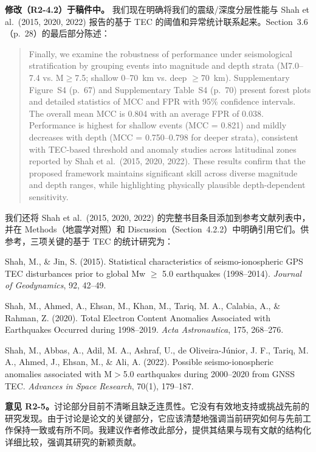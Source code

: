 \documentclass[12pt]{article}
\newcommand{\revcomment}[1]{\begingroup\color{commentcolor}#1\endgroup}
\newcommand{\revchange}[1]{\begingroup\color{changecolor}#1\endgroup}
\begin{document}
\revchange{%
\textbf{修改（R2-4.2）于稿件中。}
我们现在明确将我们的震级/深度分层性能与 Shah et al.~(2015, 2020, 2022) 报告的基于 TEC 的阈值和异常统计联系起来。Section~3.6（p.~28）的最后部分陈述：

\begin{quote}
Finally, we examine the robustness of performance under seismological stratification by grouping events into magnitude and depth strata (M7.0--7.4 vs. M$\ge$7.5; shallow 0--70~km vs. deep $\ge$70~km). Supplementary Figure~S4 (p.~67) and Supplementary Table~S4 (p.~70) present forest plots and detailed statistics of MCC and FPR with 95\% confidence intervals. The overall mean MCC is 0.804 with an average FPR of 0.038. Performance is highest for shallow events (MCC = 0.821) and mildly decreases with depth (MCC = 0.750--0.798 for deeper strata), consistent with TEC-based threshold and anomaly studies across latitudinal zones reported by Shah et al.~(2015, 2020, 2022). These results confirm that the proposed framework maintains significant skill across diverse magnitude and depth ranges, while highlighting physically plausible depth-dependent sensitivity.
\end{quote}

我们还将 Shah et al.~(2015, 2020, 2022) 的完整书目条目添加到参考文献列表中，并在 Methods（地震学对照）和 Discussion（Section~4.2.2）中明确引用它们。供参考，三项关键的基于 TEC 的统计研究为：

Shah, M., \& Jin, S. (2015). Statistical characteristics of seismo-ionospheric GPS TEC disturbances prior to global Mw $\ge$ 5.0 earthquakes (1998--2014). \emph{Journal of Geodynamics}, 92, 42--49.

Shah, M., Ahmed, A., Ehsan, M., Khan, M., Tariq, M. A., Calabia, A., \& Rahman, Z. (2020). Total Electron Content Anomalies Associated with Earthquakes Occurred during 1998--2019. \emph{Acta Astronautica}, 175, 268--276.

Shah, M., Abbas, A., Adil, M. A., Ashraf, U., de Oliveira-J{\'u}nior, J. F., Tariq, M. A., Ahmed, J., Ehsan, M., \& Ali, A. (2022). Possible seismo-ionospheric anomalies associated with M$>$5.0 earthquakes during 2000--2020 from GNSS TEC. \emph{Advances in Space Research}, 70(1), 179--187.
}

\bigskip

\revcomment{%
\textbf{意见 R2-5。}讨论部分目前不清晰且缺乏连贯性。它没有有效地支持或挑战先前的研究发现。由于讨论是论文的关键部分，它应该清楚地强调当前研究如何与先前工作保持一致或有所不同。我建议作者修改此部分，提供其结果与现有文献的结构化详细比较，强调其研究的新颖贡献。
}
\end{document}
